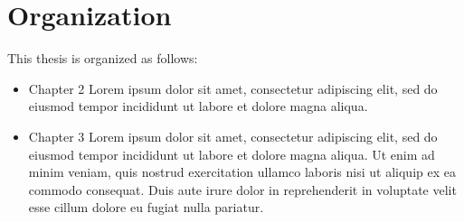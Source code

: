 \section{Organization}

This thesis is organized as follows:
\begin{itemize}
    \item Chapter 2 Lorem ipsum dolor sit amet, consectetur adipiscing elit, sed do eiusmod tempor incididunt ut labore et dolore magna aliqua.
    \item Chapter 3 Lorem ipsum dolor sit amet, consectetur adipiscing elit, sed do eiusmod tempor incididunt ut labore et dolore magna aliqua. Ut enim ad minim veniam, quis nostrud exercitation ullamco laboris nisi ut aliquip ex ea commodo consequat. Duis aute irure dolor in reprehenderit in voluptate velit esse cillum dolore eu fugiat nulla pariatur.
\end{itemize}
